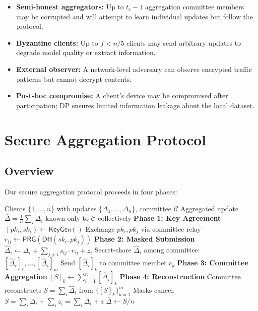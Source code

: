 \documentclass[11pt,a4paper]{article}
\newcommand{\parsfl}{\textsc{ParsFL}\xspace}
\begin{document}
\begin{itemize}
    \item \textbf{Semi-honest aggregators:} Up to $t_c - 1$ aggregation committee members may be corrupted and will attempt to learn individual updates but follow the protocol.
    \item \textbf{Byzantine clients:} Up to $f < n/5$ clients may send arbitrary updates to degrade model quality or extract information.
    \item \textbf{External observer:} A network-level adversary can observe encrypted traffic patterns but cannot decrypt contents.
    \item \textbf{Post-hoc compromise:} A client's device may be compromised after participation; DP ensures limited information leakage about the local dataset.
\end{itemize}

\section{Secure Aggregation Protocol}

\subsection{Overview}

Our secure aggregation protocol proceeds in four phases:

\begin{algorithm}[H]
\caption{\parsfl Secure Aggregation}
\label{alg:secagg}
\begin{algorithmic}[1]
\Require Clients $\{1, \ldots, n\}$ with updates $\{\Delta_1, \ldots, \Delta_n\}$, committee $\mathcal{C}$
\Ensure Aggregated update $\bar{\Delta} = \frac{1}{n}\sum_i \Delta_i$ known only to $\mathcal{C}$ collectively
\Statex \textbf{Phase 1: Key Agreement}
    \State $(pk_i, sk_i) \leftarrow \mathsf{KeyGen}()$
    \State Exchange $pk_i, pk_j$ via committee relay
    \State $r_{ij} \leftarrow \mathsf{PRG}(\mathsf{DH}(sk_i, pk_j))$
\EndFor
\Statex \textbf{Phase 2: Masked Submission}
    \State $\hat{\Delta}_i \leftarrow \Delta_i + \sum_{j \neq i} s_{ij} \cdot r_{ij} + z_i$ 
    \State Secret-share $\hat{\Delta}_i$ among committee: $[\hat{\Delta}_i]_1, \ldots, [\hat{\Delta}_i]_m$
    \State Send $[\hat{\Delta}_i]_k$ to committee member $c_k$
\EndFor
\Statex \textbf{Phase 3: Committee Aggregation}
    \State $[S]_k \leftarrow \sum_{i=1}^{n} [\hat{\Delta}_i]_k$ 
\EndFor
\Statex \textbf{Phase 4: Reconstruction}
\State Committee reconstructs $S = \sum_i \hat{\Delta}_i$ from $\{[S]_k\}_{k=1}^{m}$
\State Masks cancel: $S = \sum_i \Delta_i + \sum_i z_i = \sum_i \Delta_i + z$
\State $\bar{\Delta} \leftarrow S / n$
\end{algorithmic}
\end{algorithm}
\end{document}
